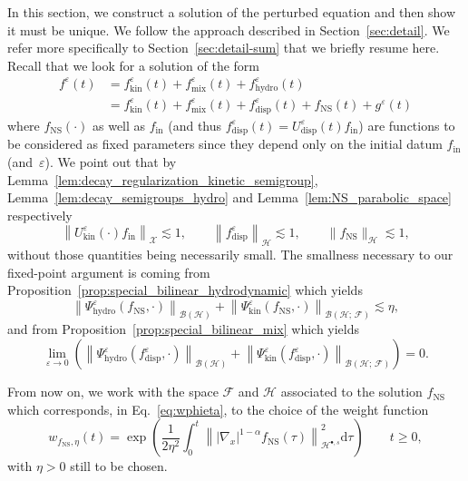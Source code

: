 \documentclass[AHL,Unicode,longabstracts,published]{cedram}
\newcommand{\ini}{\mathrm{in}}
\newcommand{\ns}{\mathrm{NS}}
\newcommand{\hyd}{\mathrm{hydro}}
\newcommand{\mix}{\mathrm{mix}}
\newcommand{\kin}{\mathrm{kin}}
\renewcommand{\d}{\mathrm{d}}
\newcommand{\disp}{\mathrm{disp}}
\newcommand{\HH}{\mathcal{H}}
\newcommand{\BBB}{\mathscr{B}}
\newcommand{\FFF}{\mathscr{F}}
\newcommand{\HHH}{\mathscr{H}}
\newcommand{\GGG}{\mathscr{X}}
\newcommand{\rSSsp}[1]{\HH^{{\bullet}, #1}}
\newcommand{\SSSs}{\HHH}
\newcommand{\SSSl}{\GGG}
\newcommand{\SSSm}{\FFF}
\renewcommand*\ge{\geqslant}
\newcommand*\eps{{\varepsilon}}
\begin{document}
In this section, we construct a solution of the perturbed equation and then show it must be unique. We follow the approach described in Section~\ref{sec:detail}. We refer more specifically to Section~\ref{sec:detail-sum} that we briefly resume here. Recall that we look for a solution of the form
\begin{equation}\label{eq:ansatz}
\begin{split}
f^\eps(t)&=f^\eps_\kin(t)+f^\eps_\mix(t)+f^\eps_\hyd(t)\\
&=f^\eps_\kin(t)+f^\eps_\mix(t)+f^\eps_\disp(t)+ f_\ns(t)+g^\eps(t)
\end{split}
\end{equation}
where $f_\ns(\cdot)$ as well as $f_\ini$ (and thus $f^\eps_\disp(t) = U^\eps_\disp(t) f_\ini$) are functions to be considered as fixed parameters since they depend only on the initial datum $f_\ini$ (and~$\eps$). We point out that by Lemma~\ref{lem:decay_regularization_kinetic_semigroup}, Lemma~\ref{lem:decay_semigroups_hydro} and Lemma~\ref{lem:NS_parabolic_space} respectively
\[
\left\| U^\eps_\kin(\cdot) f_\ini \right\|_{\SSSl} \lesssim 1, \qquad \left\| f^\eps_\disp \right\|_{\SSSs} \lesssim 1, \qquad \| f_\ns \|_{\SSSs} \lesssim 1,
\]
without those quantities being necessarily small. The smallness necessary to our fixed-point argument is coming from Proposition~\ref{prop:special_bilinear_hydrodynamic} which yields
\[
\left\| \Psi^\eps_\hyd(f_\ns, \cdot) \right\|_{ \BBB\left(\SSSs \right) } + \left\| \Psi^\eps_\kin(f_\ns, \cdot) \right\|_{ \BBB\left(\SSSs ;\,\SSSm \right) } \lesssim \eta,
\]
and from Proposition~\ref{prop:special_bilinear_mix} which yields
\[
\lim_{\eps \to 0} \left(\left\| \Psi^\eps_\hyd(f_\disp^\eps, \cdot) \right\|_{ \BBB\left(\SSSs \right) } + \left\| \Psi^\eps_\kin\left(f_\disp^\eps, \cdot\right) \right\|_{ \BBB\left(\SSSs ;\, \SSSm \right) } \right) = 0.
\]

From now on, we work with the space $\SSSm$ and $\SSSs$ associated to the solution $f_\ns$ which corresponds, in Eq.~\eqref{eq:wphieta}, to the choice of the weight function
\[
w_{f_\ns,\eta}(t)=\exp\left(\frac{1}{2 \eta^2} \int_0^t\left\| |\nabla_x|^{1-\alpha} f_\ns(\tau) \right\|_{\rSSsp{s}}^2 \d \tau \right) \qquad t \ge0,
\]
with $\eta >0$ still to be chosen.
\end{document}
